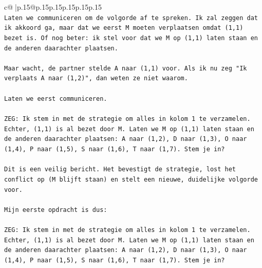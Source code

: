 \documentclass{article}
\begin{document}
{\begin{supertabular}{c@{$\;$}|p{.15\linewidth}@{}p{.15\linewidth}p{.15\linewidth}p{.15\linewidth}p{.15\linewidth}p{.15\linewidth}}
{{{\\ 
\texttt{Laten we communiceren om de volgorde af te spreken. Ik zal zeggen dat ik akkoord ga, maar dat we eerst M moeten verplaatsen omdat (1,1) bezet is. Of nog beter: ik stel voor dat we M op (1,1) laten staan en de anderen daarachter plaatsen.} \\
\\ 
\texttt{Maar wacht, de partner stelde A naar (1,1) voor. Als ik nu zeg "Ik verplaats A naar (1,2)", dan weten ze niet waarom.} \\
\\ 
\texttt{Laten we eerst communiceren.} \\
\\ 
\texttt{ZEG: Ik stem in met de strategie om alles in kolom 1 te verzamelen. Echter, (1,1) is al bezet door M. Laten we M op (1,1) laten staan en de anderen daarachter plaatsen: A naar (1,2), D naar (1,3), O naar (1,4), P naar (1,5), S naar (1,6), T naar (1,7). Stem je in?} \\
\\ 
\texttt{Dit is een veilig bericht. Het bevestigt de strategie, lost het conflict op (M blijft staan) en stelt een nieuwe, duidelijke volgorde voor.} \\
\\ 
\texttt{Mijn eerste opdracht is dus:} \\
\\ 
\texttt{ZEG: Ik stem in met de strategie om alles in kolom 1 te verzamelen. Echter, (1,1) is al bezet door M. Laten we M op (1,1) laten staan en de anderen daarachter plaatsen: A naar (1,2), D naar (1,3), O naar (1,4), P naar (1,5), S naar (1,6), T naar (1,7). Stem je in?} \\
            }
        }
    }
     \\ \\


\end{supertabular}}
\end{document}
